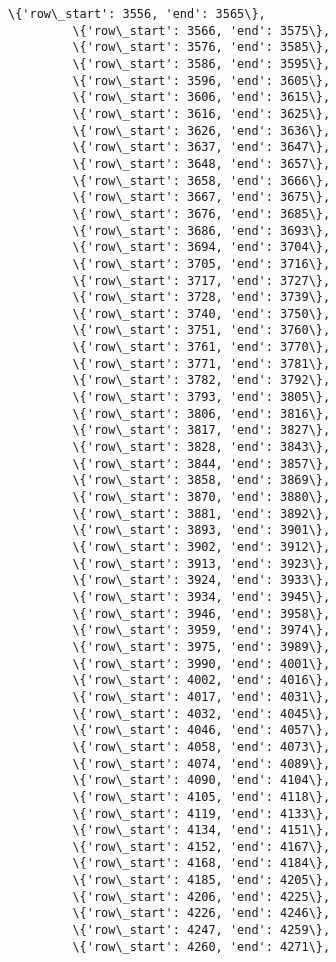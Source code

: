 \documentclass[11pt]{article}
\begin{document}
\begin{Verbatim}[commandchars=\\\{\}]
         \{'row\_start': 3556, 'end': 3565\},
         \{'row\_start': 3566, 'end': 3575\},
         \{'row\_start': 3576, 'end': 3585\},
         \{'row\_start': 3586, 'end': 3595\},
         \{'row\_start': 3596, 'end': 3605\},
         \{'row\_start': 3606, 'end': 3615\},
         \{'row\_start': 3616, 'end': 3625\},
         \{'row\_start': 3626, 'end': 3636\},
         \{'row\_start': 3637, 'end': 3647\},
         \{'row\_start': 3648, 'end': 3657\},
         \{'row\_start': 3658, 'end': 3666\},
         \{'row\_start': 3667, 'end': 3675\},
         \{'row\_start': 3676, 'end': 3685\},
         \{'row\_start': 3686, 'end': 3693\},
         \{'row\_start': 3694, 'end': 3704\},
         \{'row\_start': 3705, 'end': 3716\},
         \{'row\_start': 3717, 'end': 3727\},
         \{'row\_start': 3728, 'end': 3739\},
         \{'row\_start': 3740, 'end': 3750\},
         \{'row\_start': 3751, 'end': 3760\},
         \{'row\_start': 3761, 'end': 3770\},
         \{'row\_start': 3771, 'end': 3781\},
         \{'row\_start': 3782, 'end': 3792\},
         \{'row\_start': 3793, 'end': 3805\},
         \{'row\_start': 3806, 'end': 3816\},
         \{'row\_start': 3817, 'end': 3827\},
         \{'row\_start': 3828, 'end': 3843\},
         \{'row\_start': 3844, 'end': 3857\},
         \{'row\_start': 3858, 'end': 3869\},
         \{'row\_start': 3870, 'end': 3880\},
         \{'row\_start': 3881, 'end': 3892\},
         \{'row\_start': 3893, 'end': 3901\},
         \{'row\_start': 3902, 'end': 3912\},
         \{'row\_start': 3913, 'end': 3923\},
         \{'row\_start': 3924, 'end': 3933\},
         \{'row\_start': 3934, 'end': 3945\},
         \{'row\_start': 3946, 'end': 3958\},
         \{'row\_start': 3959, 'end': 3974\},
         \{'row\_start': 3975, 'end': 3989\},
         \{'row\_start': 3990, 'end': 4001\},
         \{'row\_start': 4002, 'end': 4016\},
         \{'row\_start': 4017, 'end': 4031\},
         \{'row\_start': 4032, 'end': 4045\},
         \{'row\_start': 4046, 'end': 4057\},
         \{'row\_start': 4058, 'end': 4073\},
         \{'row\_start': 4074, 'end': 4089\},
         \{'row\_start': 4090, 'end': 4104\},
         \{'row\_start': 4105, 'end': 4118\},
         \{'row\_start': 4119, 'end': 4133\},
         \{'row\_start': 4134, 'end': 4151\},
         \{'row\_start': 4152, 'end': 4167\},
         \{'row\_start': 4168, 'end': 4184\},
         \{'row\_start': 4185, 'end': 4205\},
         \{'row\_start': 4206, 'end': 4225\},
         \{'row\_start': 4226, 'end': 4246\},
         \{'row\_start': 4247, 'end': 4259\},
         \{'row\_start': 4260, 'end': 4271\},

\end{Verbatim}
\end{document}
